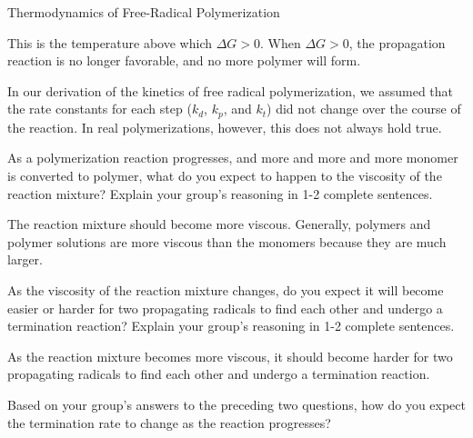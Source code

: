 \begin{activity}{Thermodynamics of Free-Radical Polymerization}
\begin{ctqs}
\begin{enumerate}
				\begin{solution}[1.5in]
					This is the temperature above which $\Delta G > 0$.  When $\Delta G > 0$, the propagation reaction is no longer favorable, and no more polymer will form.
				\end{solution}
				
		\end{enumerate}

\end{ctqs}



\begin{model}
\label{\labelbase:mdl:rxnrates}

	In our derivation of the kinetics of free radical polymerization, we assumed that the rate constants for each step ($k_d$, $k_p$, and $k_t$) did not change over the course of the reaction.  In real polymerizations, however, this does not always hold true.

\end{model}

\begin{ctqs}

	\question As a polymerization reaction progresses, and more and more and more monomer is converted to polymer, what do you expect to happen to the viscosity of the reaction mixture?  Explain your group's reasoning in 1-2 complete sentences.
	
		\begin{solution}[1.5in]
			The reaction mixture should become more viscous.  Generally, polymers and polymer solutions are more viscous than the monomers because they are much larger.		
		\end{solution}
		
	\question As the viscosity of the reaction mixture changes, do you expect it will become easier or harder for two propagating radicals to find each other and undergo a termination reaction?  Explain your group's reasoning in 1-2 complete sentences.
	
		\begin{solution}[1.5in]
			As the reaction mixture becomes more viscous, it should become harder for two propagating radicals to find each other and undergo a termination reaction.
		\end{solution}
	
	\question Based on your group's answers to the preceding two questions, how do you expect the termination rate to change as the reaction progresses?
	

\end{ctqs}
\end{activity}
